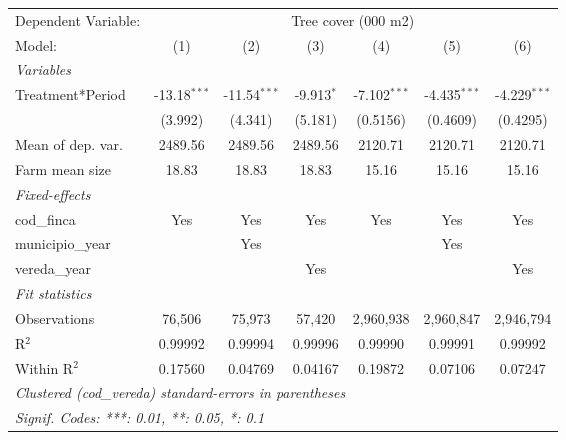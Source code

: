 
\begingroup
\centering
\begin{tabular}{lcccccc}
   \tabularnewline \midrule \midrule
   Dependent Variable: & \multicolumn{6}{c}{Tree cover (000 m2)}\\
   Model:            & (1)            & (2)            & (3)          & (4)            & (5)            & (6)\\  
   \midrule
   \emph{Variables}\\
   Treatment*Period  & -13.18$^{***}$ & -11.54$^{***}$ & -9.913$^{*}$ & -7.102$^{***}$ & -4.435$^{***}$ & -4.229$^{***}$\\   
                     & (3.992)        & (4.341)        & (5.181)      & (0.5156)       & (0.4609)       & (0.4295)\\   
   Mean of dep. var. & 2489.56        & 2489.56        & 2489.56      & 2120.71        & 2120.71        & 2120.71\\  
   Farm mean size    & 18.83          & 18.83          & 18.83        & 15.16          & 15.16          & 15.16\\  
   \midrule
   \emph{Fixed-effects}\\
   cod\_finca        & Yes            & Yes            & Yes          & Yes            & Yes            & Yes\\  
   municipio\_year   &                & Yes            &              &                & Yes            & \\  
   vereda\_year      &                &                & Yes          &                &                & Yes\\  
   \midrule
   \emph{Fit statistics}\\
   Observations      & 76,506         & 75,973         & 57,420       & 2,960,938      & 2,960,847      & 2,946,794\\  
   R$^2$             & 0.99992        & 0.99994        & 0.99996      & 0.99990        & 0.99991        & 0.99992\\  
   Within R$^2$      & 0.17560        & 0.04769        & 0.04167      & 0.19872        & 0.07106        & 0.07247\\  
   \midrule \midrule
   \multicolumn{7}{l}{\emph{Clustered (cod\_vereda) standard-errors in parentheses}}\\
   \multicolumn{7}{l}{\emph{Signif. Codes: ***: 0.01, **: 0.05, *: 0.1}}\\
\end{tabular}
\par\endgroup


